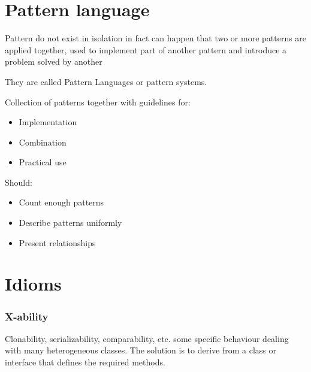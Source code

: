 \section{Pattern language}

Pattern do not exist in isolation in fact can happen that two or more patterns are applied together,
used to implement part of another pattern and introduce a problem solved by another

They are called Pattern Languages or pattern systems.\newline


\noindent\begin{minipage}{0.95\linewidth}
  \begin{minipage}[t]{0.5\linewidth}

    Collection of patterns together with guidelines for:

    \begin{itemize}
      \item Implementation
      \item Combination
      \item Practical use
    \end{itemize}


  \end{minipage}%
  \hfill
  \begin{minipage}[t]{0.47\linewidth}


    Should:

    \begin{itemize}
      \item Count enough patterns
      \item Describe patterns uniformly
      \item Present relationships
    \end{itemize}

  \end{minipage}
\end{minipage}

\section{Idioms}

\subsubsection{X-ability}
Clonability, serializability, comparability, etc. some specific
behaviour dealing with many heterogeneous classes.
The solution is to derive from a class or interface that defines the
required methods.


